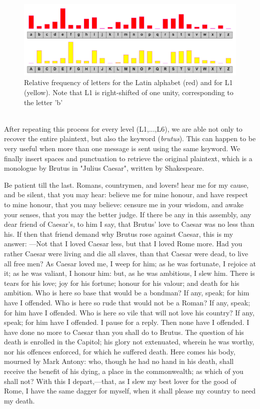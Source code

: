 \documentclass[Lau,binding=0.6cm,oneside]{sapthesis}
\begin{document}
\begin{figure}[H]
\includegraphics[scale=0.43]{kasiski_frequency_L1}
\centering
\caption{Relative frequency of letters for the Latin alphabet (red) and for L1 (yellow). Note that L1 is right-shifted of one unity, corresponding to the letter 'b'}
\centering
\end{figure}

\ \\
After repeating this process for every level (L1,...,L6), we are able not only to recover the entire plaintext, but also the keyword (\textit{brutus}). This can happen to be very useful when more than one message is sent using the same keyword. We finally insert spaces and punctuation to retrieve the original plaintext, which is a monologue by Brutus in "Julius Caesar", written by Shakespeare.

\begin{displayquote}{\small{\textsf{Be patient till the last. Romans, countrymen, and lovers! hear me for my cause, and be silent, that you may hear: believe me for mine honour, and have respect to mine honour, that you may believe: censure me in your wisdom, and awake your senses, that you may the better judge. If there be any in this assembly, any dear friend of Caesar's, to him I say, that Brutus' love to Caesar was no less than his. If then that friend demand why Brutus rose against Caesar, this is my answer: —Not that I loved Caesar less, but that I loved Rome more. Had you rather Caesar were living and die all slaves, than that Caesar were dead, to live all free men? As Caesar loved me, I weep for him; as he was fortunate, I rejoice at it; as he was valiant, I honour him: but, as he was ambitious, I slew him. There is tears for his love; joy for his fortune; honour for his valour; and death for his ambition. Who is here so base that would be a bondman? If any, speak; for him have I offended. Who is here so rude that would not be a Roman? If any, speak; for him have I offended. Who is here so vile that will not love his country? If any, speak; for him have I offended. I pause for a reply. Then none have I offended. I have done no more to Caesar than you shall do to Brutus. The question of his death is enrolled in the Capitol; his glory not extenuated, wherein he was worthy, nor his offences enforced, for which he suffered death. Here comes his body, mourned by Mark Antony: who, though he had no hand in his death, shall receive the benefit of his dying, a place in the commonwealth; as which of you shall not? With this I depart,—that, as I slew my best lover for the good of Rome, I have the same dagger for myself, when it shall please my country to need my death.}}}
\end{displayquote}
\end{document}
